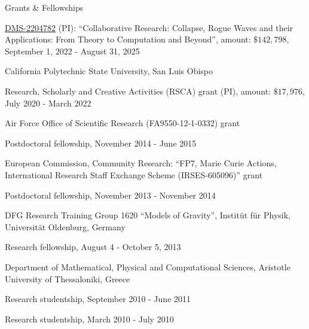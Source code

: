\documentclass[10pt]{article} %
\newenvironment{outerlist}[1][\enskip\textbullet]%
        {\begin{itemize}[#1]}{\end{itemize}%
         \vspace{-.6\baselineskip}}
\newenvironment{innerlist}[1][\enskip\textbullet]%
        {\begin{compactitem}[#1]}{\end{compactitem}}
\begin{document}
\begin{section}{Grants \& Fellowships}
\begin{outerlist}
\begin{innerlist}
\item[$\triangleright$] \href{https://www.nsf.gov/awardsearch/showAward?AWD_ID=2204782&HistoricalAwards=false}{DMS-2204782} (PI): %
``Collaborative Research: Collapse, Rogue Waves and their Applications: From Theory to Computation and Beyond'', %
amount: $\$142,798$, September 1, 2022 - August 31, 2025 
\end{innerlist}
\item[$\bullet$]
California Polytechnic State University, San Luis Obispo
\begin{innerlist} 
\item[$\triangleright$] Research, Scholarly and Creative Activities (RSCA)
grant (PI), amount: $\$17,976$, July 2020 - March 2022
\end{innerlist}
\item[$\bullet$]
Air Force Office of Scientific Research (FA9550-12-1-0332) grant
\begin{innerlist}
\item[$\triangleright$] Postdoctoral fellowship, November 2014 - June 2015
\end{innerlist}
\item[$\bullet$] European Commission, Community Research: ``FP7, Marie Curie 
Actions, International Research Staff Exchange Scheme (IRSES-605096)'' grant
\begin{innerlist}
\item[$\triangleright$] Postdoctoral fellowship, November 2013 - November 2014
\end{innerlist}
\item[$\bullet$] DFG Research Training Group 1620 ``Models of Gravity'',
Instit\"ut f\"ur Physik, Universit\"at Oldenburg, Germany
\begin{innerlist}
\item[$\triangleright$] Research fellowship, August 4 - October 5, 2013
\end{innerlist}
\item[$\bullet$] Department of Mathematical, Physical and Computational 
Sciences, Aristotle University of Thessaloniki, Greece
\begin{innerlist}
\item [$\triangleright$] Research studentship, September 2010 - June 2011
\item [$\triangleright$] Research studentship, March 2010 - July 2010
\end{innerlist}

\end{outerlist}

\end{section}
\end{document}
